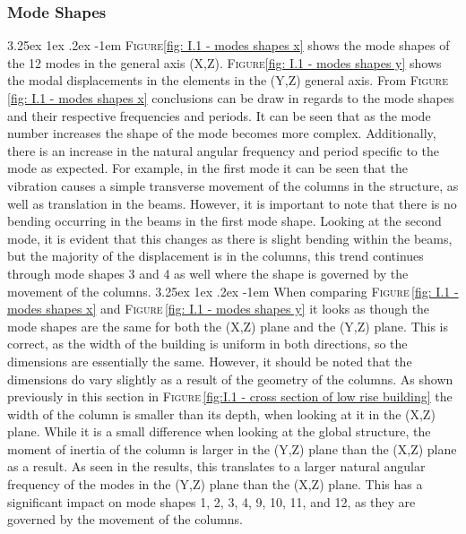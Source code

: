 \documentclass[11pt,a4paper,titlepage]{report}
\makeatletter
\renewcommand\paragraph{\@startsection{paragraph}{5}{\z@}%
  {3.25ex \@plus1ex \@minus.2ex}%
  {-1em}%
  {\normalfont\normalsize\bfseries}}
\makeatother
\begin{document}
\subsubsection{Mode Shapes}
\paragraph{}\textsc{Figure}\ref{fig: I.1 - modes shapes x} shows the mode shapes of the 12 modes in the general axis (X,Z). \textsc{Figure}\ref{fig: I.1 - modes shapes y} shows the modal displacements in the elements in the (Y,Z) general axis. From \textsc{Figure}\,\ref{fig: I.1 - modes shapes x} conclusions can be draw in regards to the mode shapes and their respective frequencies and periods. It can be seen that as the mode number increases the shape of the mode becomes more complex. Additionally, there is an increase in the natural angular frequency and period specific to the mode as expected. For example, in the first mode it can be seen that the vibration causes a simple transverse movement of the columns in the structure, as well as translation in the beams. However, it is important to note that there is no bending occurring in the beams in the first mode shape. Looking at the second mode, it is evident that this changes as there is slight bending within the beams, but the majority of the displacement is in the columns, this trend continues through mode shapes 3 and 4 as well where the shape is governed by the movement of the columns.
\paragraph{}When comparing \textsc{Figure}\,\ref{fig: I.1 - modes shapes x} and \textsc{Figure}\,\ref{fig: I.1 - modes shapes y} it looks as though the mode shapes are the same for both the (X,Z) plane and the (Y,Z) plane. This is correct, as the width of the building is uniform in both directions, so the dimensions are essentially the same. However, it should be noted that the dimensions do vary slightly as a result of the geometry of the columns. As shown previously in this section in \textsc{Figure}\,\ref{fig:I.1 - cross section of low rise building} the width of the column is smaller than its depth, when looking at it in the (X,Z) plane. While it is a small difference when looking at the global structure, the moment of inertia of the column is larger in the (Y,Z) plane than the (X,Z) plane as a result. As seen in the results, this translates to a larger natural angular frequency of the modes in the (Y,Z) plane than the (X,Z) plane. This has a significant impact on mode shapes 1, 2, 3, 4, 9, 10, 11, and 12, as they are governed by the movement of the columns. 
\end{document}
